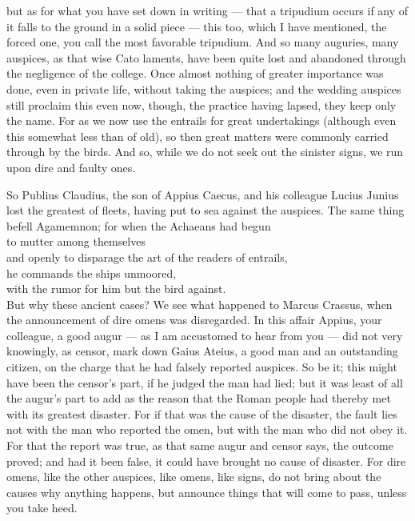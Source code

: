  but as for what you have set down in writing — that a tripudium occurs if any of it falls to the ground in a solid piece — this too, which I have mentioned, the forced one, you call the most favorable tripudium. And so many auguries, many auspices, as that wise Cato laments, have been quite lost and abandoned through the negligence of the college. Once almost nothing of greater importance was done, even in private life, without taking the auspices; and the wedding auspices still proclaim this even now, though, the practice having lapsed, they keep only the name. For as we now use the entrails for great undertakings (although even this somewhat less than of old), so then great matters were commonly carried through by the birds. And so, while we do not seek out the sinister signs, we run upon dire and faulty ones.

 So Publius Claudius, the son of Appius Caecus, and his colleague Lucius Junius lost the greatest of fleets, having put to sea against the auspices. The same thing befell Agamemnon; for when the Achaeans had begun \\
to mutter among themselves \\
and openly to disparage the art of the readers of entrails, \\
he commands the ships unmoored, \\
with the rumor for him but the bird against. \\
But why these ancient cases? We see what happened to Marcus Crassus, when the announcement of dire omens was disregarded. In this affair Appius, your colleague, a good augur — as I am accustomed to hear from you — did not very knowingly, as censor, mark down Gaius Ateius, a good man and an outstanding citizen, on the charge that he had falsely reported auspices. So be it; this might have been the censor's part, if he judged the man had lied; but it was least of all the augur's part to add as the reason that the Roman people had thereby met with its greatest disaster. For if that was the cause of the disaster, the fault lies not with the man who reported the omen, but with the man who did not obey it. For that the report was true, as that same augur and censor says, the outcome proved; and had it been false, it could have brought no cause of disaster. For dire omens, like the other auspices, like omens, like signs, do not bring about the causes why anything happens, but announce things that will come to pass, unless you take heed.

